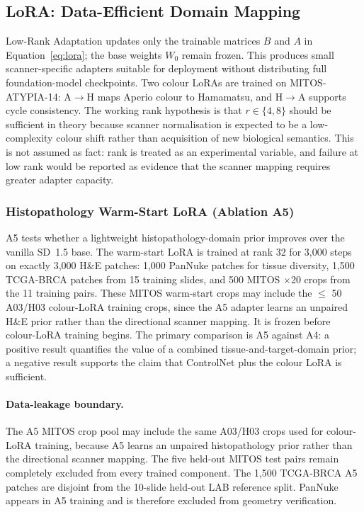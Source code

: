 \documentclass[a4paper,twoside,12pt]{report}
\begin{document}
\subsection{LoRA: Data-Efficient Domain Mapping}

Low-Rank Adaptation updates only the trainable matrices $B$ and $A$ in Equation~\ref{eq:lora}; the base weights $W_0$ remain frozen. This produces small scanner-specific adapters suitable for deployment without distributing full foundation-model checkpoints. Two colour LoRAs are trained on MITOS-ATYPIA-14: A$\rightarrow$H maps Aperio colour to Hamamatsu, and H$\rightarrow$A supports cycle consistency. The working rank hypothesis is that $r\in\{4,8\}$ should be sufficient in theory because scanner normalisation is expected to be a low-complexity colour shift rather than acquisition of new biological semantics. This is not assumed as fact: rank is treated as an experimental variable, and failure at low rank would be reported as evidence that the scanner mapping requires greater adapter capacity.

\subsubsection{Histopathology Warm-Start LoRA (Ablation A5)}
\label{sec:hist_lora}

A5 tests whether a lightweight histopathology-domain prior improves over the vanilla SD~1.5 base. The warm-start LoRA is trained at rank 32 for 3{,}000 steps on exactly 3{,}000 H\&E patches: 1{,}000 PanNuke patches for tissue diversity, 1{,}500 TCGA-BRCA patches from 15 training slides, and 500 MITOS $\times$20 crops from the 11 training pairs. These MITOS warm-start crops may include the $\leq$ 50 A03/H03 colour-LoRA training crops, since the A5 adapter learns an unpaired H\&E prior rather than the directional scanner mapping. It is frozen before colour-LoRA training begins. The primary comparison is A5 against A4: a positive result quantifies the value of a combined tissue-and-target-domain prior; a negative result supports the claim that ControlNet plus the colour LoRA is sufficient.

\paragraph{Data-leakage boundary.} The A5 MITOS crop pool may include the same A03/H03 crops used for colour-LoRA training, because A5 learns an unpaired histopathology prior rather than the directional scanner mapping. The five held-out MITOS test pairs remain completely excluded from every trained component. The 1{,}500 TCGA-BRCA A5 patches are disjoint from the 10-slide held-out LAB reference split. PanNuke appears in A5 training and is therefore excluded from geometry verification.
\end{document}
